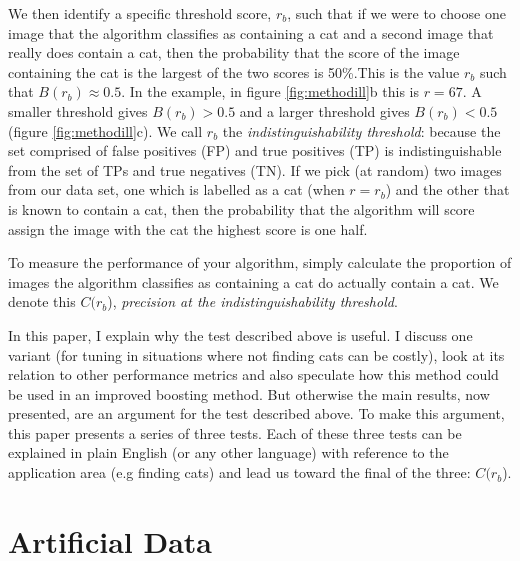 \documentclass{article}
\begin{document}
We then identify a specific threshold score, $r_b$, such that if we were to choose one image that the algorithm classifies as containing a cat and a second image that really does contain a cat, then the probability that the score of the image containing the cat is the largest of the two scores is 50\%.This is the value $r_b$ such that $B(r_b) \approx 0.5$. In the example, in figure \ref{fig:methodill}b this is $r=67$. A smaller threshold gives $B(r_b) > 0.5$ and a larger threshold gives $B(r_b) < 0.5$ (figure \ref{fig:methodill}c). We call $r_b$ the {\it indistinguishability threshold}: because the set comprised of false positives (FP) and true positives (TP) is indistinguishable from the set of TPs and true negatives (TN). If we pick (at random) two images from our data set, one which is labelled as a cat (when $r=r_b$) and the other that is known to contain a cat, then the probability that the algorithm will score assign the  image with the cat the highest score is one half. 

To measure the performance of your algorithm, simply calculate the proportion of images the algorithm classifies as containing a cat do actually contain a cat. We denote this $C(r_b$), {\it precision at the indistinguishability threshold}.

In this paper, I explain why the test described above is useful. I discuss one variant (for tuning in situations where not finding cats can be costly), look at its relation to other performance metrics and also speculate how this method could be used in an improved boosting method. But otherwise the main results, now presented, are an argument for the test described above. To make this argument, this paper presents a series of three tests. Each of these three tests can be explained in plain English (or any other language) with reference to the application area (e.g finding cats) and lead us toward the final of the three: $C(r_b$).

\section{Artificial Data}
\end{document}
